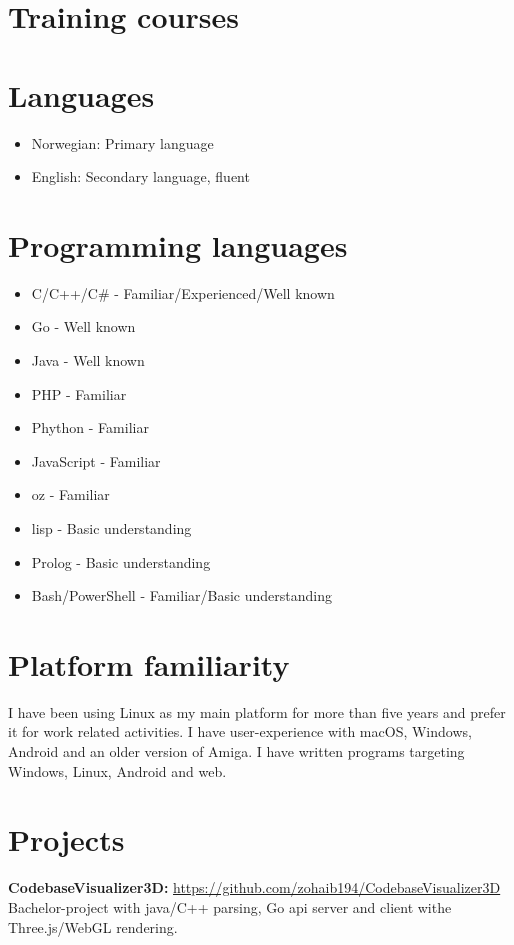 \documentclass{crudecv/crudecv}
\begin{document}
\section*{Training courses}
\begin{experiences}
\end{experiences}

\section*{Languages}
\begin{itemize}
    \item Norwegian: Primary language
    \item English: Secondary language, fluent
\end{itemize}


\section*{Programming languages}
\begin{multicols}{2}
\begin{itemize}
    \item C/C++/C\# - Familiar/Experienced/Well known
    \item Go - Well known
    \item Java - Well known
    \item PHP - Familiar
    \item Phython - Familiar
    \item JavaScript - Familiar
    \item oz - Familiar
    \item lisp - Basic understanding
    \item Prolog - Basic understanding
    \item Bash/PowerShell - Familiar/Basic understanding
\end{itemize}
\end{multicols}
\section*{Platform familiarity}
I have been using Linux as my main platform for more than five years and prefer it for work related activities. I have user-experience with macOS, Windows, Android and an older version of Amiga. I have written programs targeting Windows, Linux, Android and web.

\section*{Projects}
\textbf{CodebaseVisualizer3D:} \hfill \href{https://github.com/zohaib194/CodebaseVisualizer3D}{https://github.com/zohaib194/CodebaseVisualizer3D} \\
Bachelor-project with java/C++ parsing, Go api server and client withe Three.js/WebGL rendering.
\end{document}
